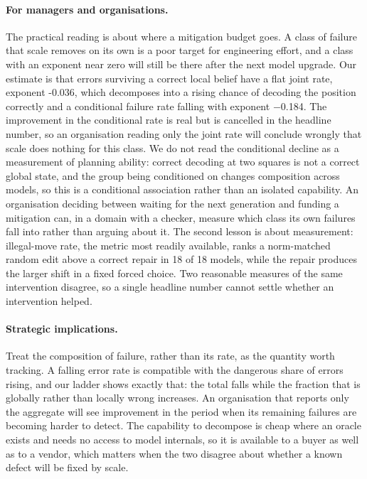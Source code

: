 \documentclass[11pt]{article}
\begin{document}
\paragraph{For managers and organisations.}
The practical reading is about where a mitigation budget goes. A class of failure
that scale removes on its own is a poor target for engineering effort, and a class
with an exponent near zero will still be there after the next model upgrade. Our
estimate is that errors surviving a correct local belief have a flat joint rate,
exponent -0.036, which decomposes into a rising chance of decoding the
position correctly and a conditional failure rate falling with exponent $-$0.184.
The improvement in the conditional rate is real but is cancelled in the headline
number, so an
organisation reading only the joint rate will conclude wrongly that scale does nothing
for this class. We do not read the conditional decline as a measurement of planning
ability: correct decoding at two squares is not a correct global state, and the group
being conditioned on changes composition across models, so this is a conditional
association rather than an isolated capability.
An organisation deciding between waiting for the next generation and funding a
mitigation can, in a domain with a checker, measure which class its own failures
fall into rather than arguing about it. The second lesson is about measurement:
illegal-move rate, the metric most readily available, ranks a norm-matched random
edit above a correct repair in 18 of 18 models, while the repair
produces the larger shift in a fixed forced choice. Two reasonable measures of the
same intervention disagree, so a single headline number cannot settle whether an
intervention helped.

\paragraph{Strategic implications.}
Treat the composition of failure, rather than its rate, as the quantity worth
tracking. A falling error rate is compatible with the dangerous share of errors
rising, and our ladder shows exactly that: the total falls while the fraction that
is globally rather than locally wrong increases. An organisation that reports only
the aggregate will see improvement in the period when its remaining failures are
becoming harder to detect. The capability to decompose is cheap where an oracle
exists and needs no access to model internals, so it is available to a buyer as well
as to a vendor, which matters when the two disagree about whether a known defect
will be fixed by scale.
\end{document}
